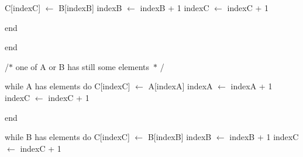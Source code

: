 \documentclass[12pt]{article}
\begin{document}
\begin{adjustwidth}{0.77in}{4.84in}
{\fontsize{11pt}{13.2pt}\selectfont C[indexC] $ \leftarrow $  B[indexB] indexB $ \leftarrow $  indexB + 1 indexC $ \leftarrow $  indexC + 1\par}\par

\end{adjustwidth}

\begin{adjustwidth}{0.54in}{0.0in}
{\fontsize{11pt}{13.2pt}\selectfont end\par}\par

\end{adjustwidth}

\begin{adjustwidth}{0.31in}{0.0in}
{\fontsize{11pt}{13.2pt}\selectfont end\par}\par

\end{adjustwidth}

\begin{adjustwidth}{0.31in}{0.0in}
{\fontsize{11pt}{13.2pt}\selectfont /$\ast$  one of A or B has still some elements\  $\ast$ /\par}\par

\end{adjustwidth}

\begin{adjustwidth}{0.54in}{5.06in}
{\fontsize{11pt}{13.2pt}\selectfont while A has elements  do C[indexC] $ \leftarrow $  A[indexA] indexA $ \leftarrow $  indexA + 1 indexC $ \leftarrow $  indexC + 1\par}\par

\end{adjustwidth}

\begin{adjustwidth}{0.31in}{0.0in}
{\fontsize{11pt}{13.2pt}\selectfont end\par}\par

\end{adjustwidth}

\begin{adjustwidth}{0.54in}{5.08in}
{\fontsize{11pt}{13.2pt}\selectfont while B has elements  do C[indexC] $ \leftarrow $  B[indexB] indexB $ \leftarrow $  indexB + 1 indexC $ \leftarrow $  indexC + 1\par}\par

\end{adjustwidth}
\end{document}
